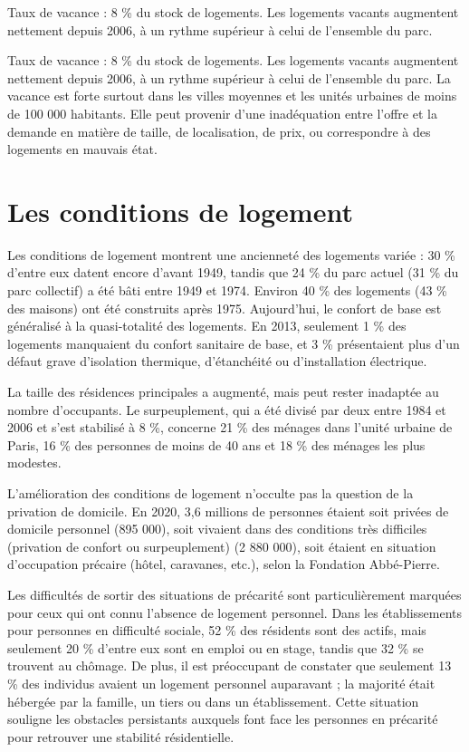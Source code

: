 \documentclass[a4paper, 12pt]{report}
\begin{document}
Taux de vacance : 8 \% du stock de logements. Les logements vacants augmentent nettement depuis 2006, à un rythme supérieur à celui de l’ensemble du parc.

Taux de vacance : 8 \% du stock de logements. Les logements vacants augmentent nettement depuis 2006, à un rythme supérieur à celui de l’ensemble du parc. La vacance est forte surtout dans les villes moyennes et les unités urbaines de moins de 100 000 habitants. Elle peut provenir d’une inadéquation entre l’offre et la demande en matière de taille, de localisation, de prix, ou correspondre à des logements en mauvais état.

\section{Les conditions de logement}

Les conditions de logement montrent une ancienneté des logements variée : 30 \% d'entre eux datent encore d’avant 1949, tandis que 24 \% du parc actuel (31 \% du parc collectif) a été bâti entre 1949 et 1974. Environ 40 \% des logements (43 \% des maisons) ont été construits après 1975. Aujourd’hui, le confort de base est généralisé à la quasi-totalité des logements. En 2013, seulement 1 \% des logements manquaient du confort sanitaire de base, et 3 \% présentaient plus d’un défaut grave d’isolation thermique, d’étanchéité ou d’installation électrique.

La taille des résidences principales a augmenté, mais peut rester inadaptée au nombre d’occupants. Le surpeuplement, qui a été divisé par deux entre 1984 et 2006 et s'est stabilisé à 8 \%, concerne 21 \% des ménages dans l’unité urbaine de Paris, 16 \% des personnes de moins de 40 ans et 18 \% des ménages les plus modestes.

L’amélioration des conditions de logement n’occulte pas la question de la privation de domicile. En 2020, 3,6 millions de personnes étaient soit privées de domicile personnel (895 000), soit vivaient dans des conditions très difficiles (privation de confort ou surpeuplement) (2 880 000), soit étaient en situation d’occupation précaire (hôtel, caravanes, etc.), selon la Fondation Abbé-Pierre.

Les difficultés de sortir des situations de précarité sont particulièrement marquées pour ceux qui ont connu l’absence de logement personnel. Dans les établissements pour personnes en difficulté sociale, 52 \% des résidents sont des actifs, mais seulement 20 \% d'entre eux sont en emploi ou en stage, tandis que 32 \% se trouvent au chômage. De plus, il est préoccupant de constater que seulement 13 \% des individus avaient un logement personnel auparavant ; la majorité était hébergée par la famille, un tiers ou dans un établissement. Cette situation souligne les obstacles persistants auxquels font face les personnes en précarité pour retrouver une stabilité résidentielle.
\end{document}
